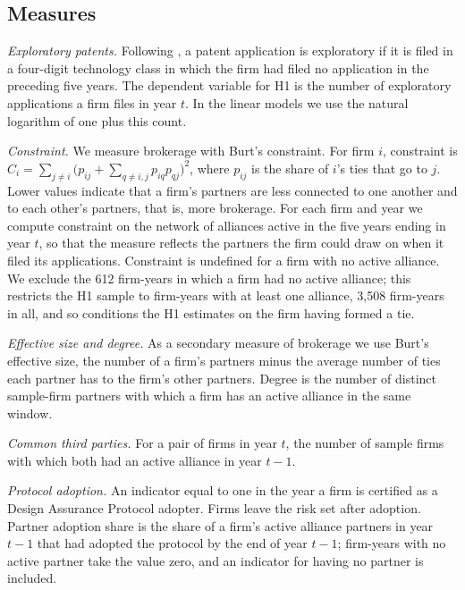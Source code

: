 \documentclass[12pt]{article}
\begin{document}
\subsection{Measures}

\textit{Exploratory patents.} Following \citet{phelps2010}, a patent application is exploratory if it is filed in a four-digit technology class in which the firm had filed no application in the preceding five years. The dependent variable for H1 is the number of exploratory applications a firm files in year $t$. In the linear models we use the natural logarithm of one plus this count.

\textit{Constraint.} We measure brokerage with Burt's \citeyearpar{burt1992} constraint. For firm $i$, constraint is $C_i = \sum_{j \neq i} \big(p_{ij} + \sum_{q \neq i,j} p_{iq} p_{qj}\big)^2$, where $p_{ij}$ is the share of $i$'s ties that go to $j$. Lower values indicate that a firm's partners are less connected to one another and to each other's partners, that is, more brokerage. For each firm and year we compute constraint on the network of alliances active in the five years ending in year $t$, so that the measure reflects the partners the firm could draw on when it filed its applications. Constraint is undefined for a firm with no active alliance. We exclude the 612 firm-years in which a firm had no active alliance; this restricts the H1 sample to firm-years with at least one alliance, 3,508 firm-years in all, and so conditions the H1 estimates on the firm having formed a tie.

\textit{Effective size and degree.} As a secondary measure of brokerage we use Burt's effective size, the number of a firm's partners minus the average number of ties each partner has to the firm's other partners. Degree is the number of distinct sample-firm partners with which a firm has an active alliance in the same window.

\textit{Common third parties.} For a pair of firms in year $t$, the number of sample firms with which both had an active alliance in year $t-1$.

\textit{Protocol adoption.} An indicator equal to one in the year a firm is certified as a Design Assurance Protocol adopter. Firms leave the risk set after adoption. Partner adoption share is the share of a firm's active alliance partners in year $t-1$ that had adopted the protocol by the end of year $t-1$; firm-years with no active partner take the value zero, and an indicator for having no partner is included.
\end{document}
